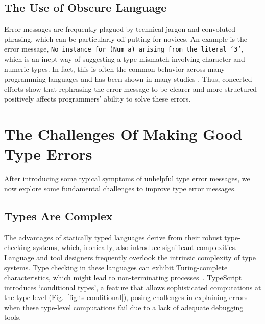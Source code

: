 \subsection*{The Use of Obscure Language}

Error messages are frequently plagued by technical jargon and convoluted phrasing, which can be particularly off-putting for novices. An example is the error message, \texttt{No instance for (Num a) arising from the literal `3'}, which is an inept way of suggesting a type mismatch involving character and numeric types. In fact, this is often the common behavior across many programming languages and has been shown in many studies \cite{Barik2017-gy, Tirronen2015-nr, Prather2017-dg}. Thus, concerted efforts \cite{Becker2016-kc, Barik2014-ib}  show that rephrasing the error message to be clearer and more structured positively affects programmers' ability to solve these errors.


\section{The Challenges Of Making Good Type Errors}
\label{sec:challenges}
After introducing some typical symptoms of unhelpful type error messages, we now explore some fundamental challenges to improve type error messages.

\subsection*{Types Are Complex}

The advantages of statically typed languages derive from their robust type-checking systems, which, ironically, also introduce significant complexities. Language and tool designers frequently overlook the intrinsic complexity of type systems.  Type checking in these languages can exhibit Turing-complete characteristics, which might lead to non-terminating processes~\cite{Wells1999-ob}. TypeScript introduces `conditional types', a feature that allows sophisticated computations at the type level (Fig.~\ref{fig:ts-conditional}), posing challenges in explaining errors when these type-level computations fail due to a lack of adequate debugging tools.



